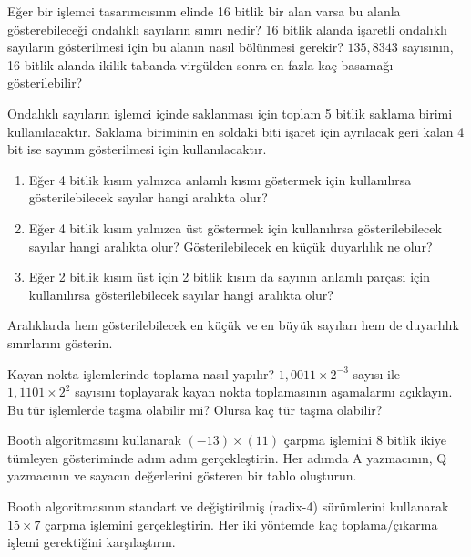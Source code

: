 \begin{alistirma}[\zor]
Eğer bir işlemci tasarımcısının elinde 16 bitlik bir alan varsa bu alanla gösterebileceği ondalıklı sayıların sınırı nedir? 16 bitlik alanda işaretli ondalıklı sayıların gösterilmesi için bu alanın nasıl bölünmesi gerekir? $135{,}8343$ sayısının, 16 bitlik alanda ikilik tabanda virgülden sonra en fazla kaç basamağı gösterilebilir?
\end{alistirma}

\begin{alistirma}[\zor]
Ondalıklı sayıların işlemci içinde saklanması için toplam 5 bitlik saklama birimi kullanılacaktır. Saklama biriminin en soldaki biti işaret için ayrılacak geri kalan 4 bit ise sayının gösterilmesi için kullanılacaktır.
\begin{enumerate}
\item Eğer 4 bitlik kısım yalnızca anlamlı kısmı göstermek için kullanılırsa gösterilebilecek sayılar hangi aralıkta olur?
\item Eğer 4 bitlik kısım yalnızca üst göstermek için kullanılırsa gösterilebilecek sayılar hangi aralıkta olur? Gösterilebilecek en küçük duyarlılık ne olur?
\item Eğer 2 bitlik kısım üst için 2 bitlik kısım da sayının anlamlı parçası için kullanılırsa gösterilebilecek sayılar hangi aralıkta olur?
\end{enumerate}
Aralıklarda hem gösterilebilecek en küçük ve en büyük sayıları hem de duyarlılık sınırlarını gösterin.
\end{alistirma}

\begin{alistirma}[\orta]
Kayan nokta işlemlerinde toplama nasıl yapılır? $1{,}0011 \times 2^{-3}$ sayısı ile $1{,}1101 \times 2^{2}$ sayısını toplayarak kayan nokta toplamasının aşamalarını açıklayın. Bu tür işlemlerde taşma olabilir mi? Olursa kaç tür taşma olabilir?
\end{alistirma}

\begin{alistirma}[\orta]
Booth algoritmasını kullanarak $(-13) \times (11)$ çarpma işlemini 8 bitlik ikiye tümleyen gösteriminde adım adım gerçekleştirin. Her adımda A yazmacının, Q yazmacının ve sayacın değerlerini gösteren bir tablo oluşturun.
\end{alistirma}

\begin{alistirma}[\orta]
Booth algoritmasının standart ve değiştirilmiş (radix-4) sürümlerini kullanarak $15 \times 7$ çarpma işlemini gerçekleştirin. Her iki yöntemde kaç toplama/çıkarma işlemi gerektiğini karşılaştırın.
\end{alistirma}

